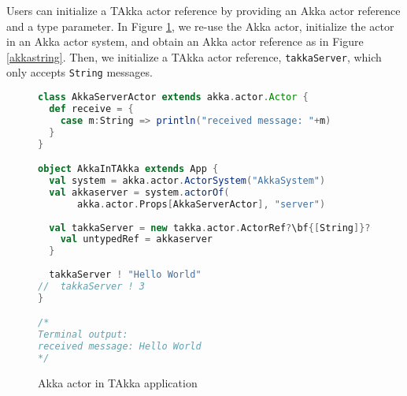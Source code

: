 Users can initialize a TAkka actor reference by providing an Akka actor 
reference and a type parameter.  In Figure \ref{akkaINtakka}, we re-use the 
Akka actor, initialize the actor in an Akka actor system, and obtain an Akka 
actor reference as in Figure \ref{akkastring}.  Then, we initialize a TAkka 
actor reference, {\tt takkaServer}, which only accepts {\tt String} messages.


\begin{figure}
\label{akkaINtakka}
      \begin{lstlisting}[language=scala, escapechar=?]
class AkkaServerActor extends akka.actor.Actor {
  def receive = {
    case m:String => println("received message: "+m)
  }
}

object AkkaInTAkka extends App {
  val system = akka.actor.ActorSystem("AkkaSystem")
  val akkaserver = system.actorOf(
       akka.actor.Props[AkkaServerActor], "server")
  
  val takkaServer = new takka.actor.ActorRef?\bf{[String]}?{
    val untypedRef = akkaserver
  }
  
  takkaServer ! "Hello World"
//  takkaServer ! 3
}

/*
Terminal output:
received message: Hello World
*/
    \end{lstlisting}
    \caption{Akka actor in TAkka application}
\end{figure}


